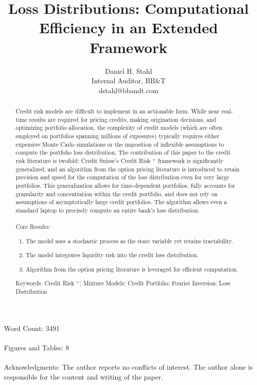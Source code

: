 \documentclass[12pt]{article}
\theoremstyle{definition}
\begin{document}
\title{Loss Distributions: Computational Efficiency in an Extended Framework}
\date{}
\author{Daniel H. Stahl\\Internal Auditor, BB\&T
        \\dstahl@bbandt.com}

\maketitle
Word Count: 3491
\\
\\
Figures and Tables: 8
\\
\\
Acknowledgments: The author reports no conflicts of interest.  The author alone is responsible for the content and writing of the paper.
\newpage
 \begin{abstract}
Credit risk models are difficult to implement in an actionable form.  While near real-time results are required for pricing credits, making origination decisions, and optimizing portfolio allocation, the complexity of credit models (which are often employed on portfolios spanning millions of exposures) typically requires either expensive Monte Carlo simulations or the imposition of inflexible assumptions to compute the portfolio loss distribution.  The contribution of this paper to the credit risk literature is twofold: Credit Suisse's Credit Risk \(^+\) framework is significantly generalized, and an algorithm from the option pricing literature is introduced to retain precision and speed for the computation of the loss distribution even for very large portfolios.  This generalization allows for time-dependent portfolios, fully accounts for granularity and concentration within the credit portfolio, and does not rely on assumptions of asymptotically large credit portfolios.  The algorithm allows even a standard laptop to precisely compute an entire bank's loss distribution.
\\
\\
Core Results:
\begin{enumerate}
\item The model uses a stochastic process as the state variable yet retains tractability.
\item The model integrates liquidity risk into the credit loss distribution.
\item Algorithm from the option pricing literature is leveraged for efficient computation.

\end{enumerate}

Keywords: Credit Risk \(^+\); Mixture Models; Credit Portfolio; Fourier Inversion; Loss Distribution
\end{abstract}
\end{document}
